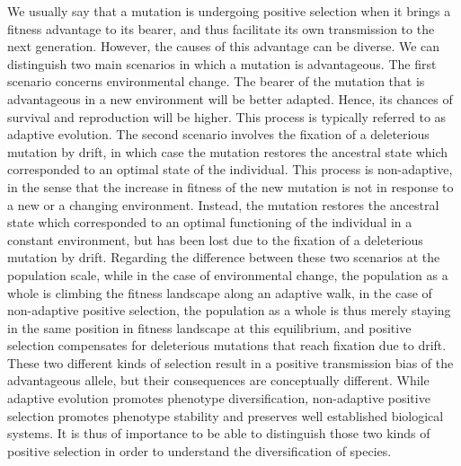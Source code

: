 \documentclass{article}
\begin{document}
    We usually say that a mutation is undergoing positive selection when it brings a fitness advantage to its bearer, and thus facilitate its own transmission to the next generation.
    However, the causes of this advantage can be diverse.
    We can distinguish two main scenarios in which a mutation is advantageous.
    The first scenario concerns environmental change.
    The bearer of the mutation that is advantageous in a new environment will be better adapted. Hence, its chances of survival and reproduction will be higher.
    This process is typically referred to as adaptive evolution.
    The second scenario involves the fixation of a deleterious mutation by drift, in which case the mutation restores the ancestral state which corresponded to an optimal state of the individual.
    This process is non-adaptive, in the sense that the increase in fitness of the new mutation is not in response to a new or a changing environment.
    Instead, the mutation restores the ancestral state which corresponded to an optimal functioning of the individual in a constant environment, but has been lost due to the fixation of a deleterious mutation by drift.
    Regarding the difference between these two scenarios at the population scale, while in the case of environmental change, the population as a whole is climbing the fitness landscape along an adaptive walk\cite{tenaillon_utility_2014}, in the case of
    non-adaptive positive selection, the population as a whole is thus merely staying in the same position in fitness landscape at this equilibrium, and positive selection compensates for deleterious mutations that reach fixation due to drift\cite{sella_application_2005, mustonen_fitness_2009}.
    These two different kinds of selection result in a positive transmission bias of the advantageous allele, but their consequences are conceptually different.
    While adaptive evolution promotes phenotype diversification, non-adaptive positive selection promotes phenotype stability and preserves well established biological systems.
    It is thus of importance to be able to distinguish those two kinds of positive selection in order to understand the diversification of species.
\end{document}
